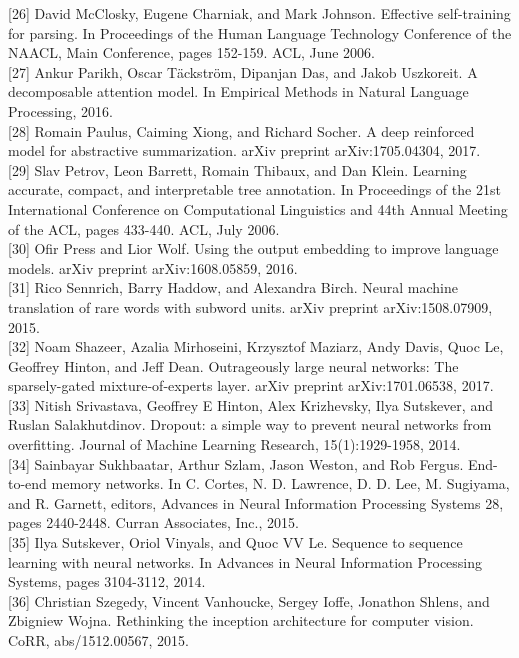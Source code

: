 \documentclass[10pt]{article}
\begin{document}
[26] David McClosky, Eugene Charniak, and Mark Johnson. Effective self-training for parsing. In Proceedings of the Human Language Technology Conference of the NAACL, Main Conference, pages 152-159. ACL, June 2006.\\[0pt]
[27] Ankur Parikh, Oscar Täckström, Dipanjan Das, and Jakob Uszkoreit. A decomposable attention model. In Empirical Methods in Natural Language Processing, 2016.\\[0pt]
[28] Romain Paulus, Caiming Xiong, and Richard Socher. A deep reinforced model for abstractive summarization. arXiv preprint arXiv:1705.04304, 2017.\\[0pt]
[29] Slav Petrov, Leon Barrett, Romain Thibaux, and Dan Klein. Learning accurate, compact, and interpretable tree annotation. In Proceedings of the 21st International Conference on Computational Linguistics and 44th Annual Meeting of the ACL, pages 433-440. ACL, July 2006.\\[0pt]
[30] Ofir Press and Lior Wolf. Using the output embedding to improve language models. arXiv preprint arXiv:1608.05859, 2016.\\[0pt]
[31] Rico Sennrich, Barry Haddow, and Alexandra Birch. Neural machine translation of rare words with subword units. arXiv preprint arXiv:1508.07909, 2015.\\[0pt]
[32] Noam Shazeer, Azalia Mirhoseini, Krzysztof Maziarz, Andy Davis, Quoc Le, Geoffrey Hinton, and Jeff Dean. Outrageously large neural networks: The sparsely-gated mixture-of-experts layer. arXiv preprint arXiv:1701.06538, 2017.\\[0pt]
[33] Nitish Srivastava, Geoffrey E Hinton, Alex Krizhevsky, Ilya Sutskever, and Ruslan Salakhutdinov. Dropout: a simple way to prevent neural networks from overfitting. Journal of Machine Learning Research, 15(1):1929-1958, 2014.\\[0pt]
[34] Sainbayar Sukhbaatar, Arthur Szlam, Jason Weston, and Rob Fergus. End-to-end memory networks. In C. Cortes, N. D. Lawrence, D. D. Lee, M. Sugiyama, and R. Garnett, editors, Advances in Neural Information Processing Systems 28, pages 2440-2448. Curran Associates, Inc., 2015.\\[0pt]
[35] Ilya Sutskever, Oriol Vinyals, and Quoc VV Le. Sequence to sequence learning with neural networks. In Advances in Neural Information Processing Systems, pages 3104-3112, 2014.\\[0pt]
[36] Christian Szegedy, Vincent Vanhoucke, Sergey Ioffe, Jonathon Shlens, and Zbigniew Wojna. Rethinking the inception architecture for computer vision. CoRR, abs/1512.00567, 2015.\\[0pt]
\end{document}
